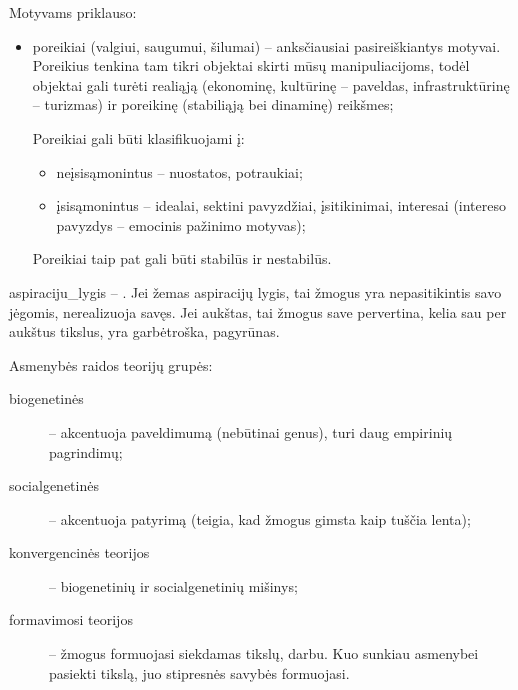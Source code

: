 Motyvams priklauso:
\begin{itemize}
  \item poreikiai (valgiui, saugumui, šilumai) – anksčiausiai 
    pasireiškiantys motyvai. Poreikius tenkina tam tikri objektai skirti
    mūsų manipuliacijoms, todėl objektai gali turėti realiąją (ekonominę,
    kultūrinę – paveldas, infrastruktūrinę – turizmas) ir poreikinę 
    (stabiliąją bei dinaminę) reikšmes;

    Poreikiai gali būti klasifikuojami į:
    \begin{itemize}
      \item neįsisąmonintus – nuostatos, potraukiai;
      \item įsisąmonintus – idealai, sektini pavyzdžiai, įsitikinimai,
        interesai (intereso pavyzdys – emocinis pažinimo motyvas);
    \end{itemize}

    Poreikiai taip pat gali būti stabilūs ir nestabilūs.
\end{itemize}


\Gls{aspiraciju_lygis} – . Jei žemas 
aspiracijų lygis, tai žmogus yra nepasitikintis savo jėgomis, nerealizuoja
savęs. Jei aukštas, tai žmogus save pervertina, kelia sau per aukštus
tikslus, yra garbėtroška, pagyrūnas.

Asmenybės raidos teorijų grupės:
\begin{description}
  \item[biogenetinės] – akcentuoja paveldimumą (nebūtinai genus), turi
    daug empirinių pagrindimų;
  \item[socialgenetinės] – akcentuoja patyrimą (teigia, kad žmogus gimsta
    kaip tuščia lenta);
  \item[konvergencinės teorijos] – biogenetinių ir socialgenetinių mišinys;
  \item[formavimosi teorijos]  – žmogus formuojasi siekdamas tikslų, darbu.
    Kuo sunkiau asmenybei pasiekti tikslą, juo stipresnės savybės 
    formuojasi.
\end{description}

